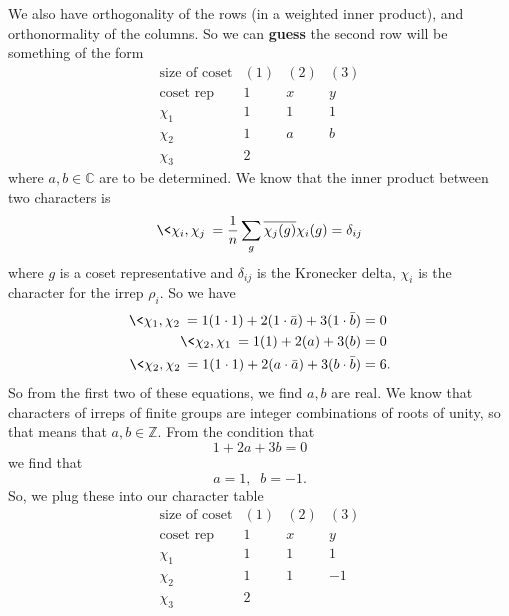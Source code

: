 We also have orthogonality of the rows (in a weighted inner
product), and orthonormality of the columns. So we can
\textbf{guess} the second row will be something of the form
\begin{equation}
\begin{array}{c|cccc}
\text{size of coset} & (1) & (2) & (3) \\
\text{coset rep} & 1 & x & y\\ \hline
\chi_1           & 1 & 1 & 1\\ 
\chi_2           & 1 & a & b\\
\chi_3           & 2 &   & 
\end{array}
\end{equation}
where $a,b\in\mathbb{C}$ are to be determined. We know that
the inner product between two characters is
\begin{equation}
\<\chi_i,\chi_j\> =
\frac{1}{n}\sum_{g}\overline{\chi_{j}(g)}\chi_{i}(g) = \delta_{ij}
\end{equation}
where $g$ is a coset representative and $\delta_{ij}$ is the
Kronecker delta, $\chi_i$ is the character for the irrep $\rho_i$. So we have
\begin{subequations}
\begin{align}
\<\chi_1,\chi_2\> = 1(1\cdot1) + 2(1\cdot\bar{a})+3(1\cdot\bar{b}) &= 0\\
\<\chi_2,\chi_1\> = 1(1)+2(a)+3(b) &= 0\\
\<\chi_2,\chi_2\> = 1(1\cdot1) + 2(a\cdot\bar{a})+3(b\cdot\bar{b}) &= 6.
\end{align}
\end{subequations}
So from the first two of these equations, we find $a,b$ are
real. We know that characters of irreps of finite groups are
integer combinations of roots of unity, so that means that
$a,b\in\mathbb{Z}$. From the condition that
\begin{equation}
1+2a+3b=0
\end{equation}
we find that
\begin{equation}
a=1,\;\; b=-1.
\end{equation}
So, we plug these into our character table
\begin{equation}
\begin{array}{c|cccc}
\text{size of coset} & (1) & (2) & (3) \\
\text{coset rep} & 1 & x & y\\ \hline
\chi_1           & 1 & 1 & 1\\ 
\chi_2           & 1 & 1 & -1\\
\chi_3           & 2 &   & 
\end{array}
\end{equation}
